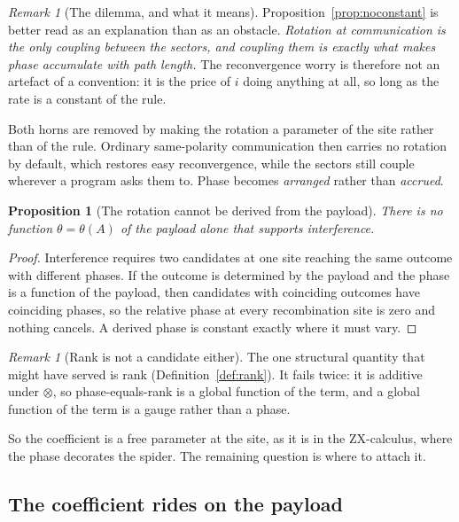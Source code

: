 \documentclass[11pt]{article}
\newtheorem{proposition}[theorem]{Proposition}
\theoremstyle{definition}
\theoremstyle{remark}
\newtheorem{remark}[theorem]{Remark}
\begin{document}
\begin{remark}[The dilemma, and what it means]
\label{rem:dilemma}
Proposition~\ref{prop:noconstant} is better read as an explanation than as an
obstacle. \emph{Rotation at communication is the only coupling between the
sectors, and coupling them is exactly what makes phase accumulate with path
length.} The reconvergence worry is therefore not an artefact of a convention:
it is the price of $i$ doing anything at all, so long as the rate is a constant
of the rule.

Both horns are removed by making the rotation a parameter of the site rather
than of the rule. Ordinary same-polarity communication then carries no rotation
by default, which restores easy reconvergence, while the sectors still couple
wherever a program asks them to. Phase becomes \emph{arranged} rather than
\emph{accrued}.
\end{remark}

\begin{proposition}[The rotation cannot be derived from the payload]
\label{prop:noderive}
There is no function $\theta = \theta(A)$ of the payload alone that supports
interference.
\end{proposition}

\begin{proof}
Interference requires two candidates at one site reaching the same outcome with
different phases. If the outcome is determined by the payload and the phase is a
function of the payload, then candidates with coinciding outcomes have
coinciding phases, so the relative phase at every recombination site is zero and
nothing cancels. A derived phase is constant exactly where it must vary.
\end{proof}

\begin{remark}[Rank is not a candidate either]
The one structural quantity that might have served is rank
(Definition~\ref{def:rank}). It fails twice: it is additive under $\otimes$, so
phase-equals-rank is a global function of the term, and a global function of the
term is a gauge rather than a phase.
\end{remark}

So the coefficient is a free parameter at the site, as it is in the
ZX-calculus, where the phase decorates the spider. The remaining question is
where to attach it.

\subsection{The coefficient rides on the payload}
\end{document}
